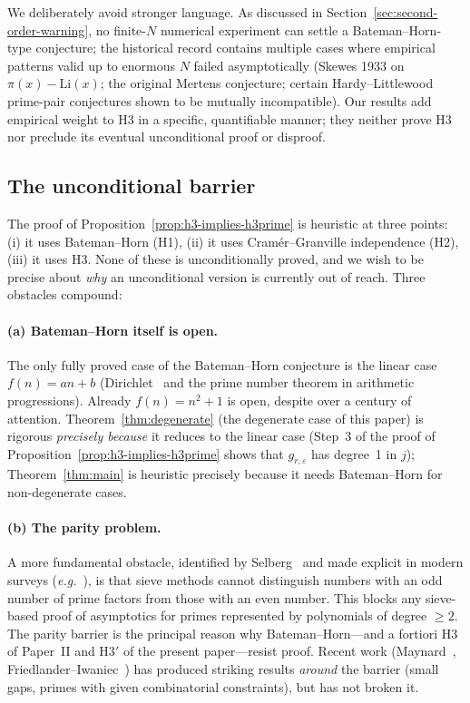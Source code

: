 \documentclass[11pt,a4paper]{article}
\theoremstyle{plain}
\theoremstyle{definition}
\newcommand{\eps}{\varepsilon}
\begin{document}
We deliberately avoid stronger language. As discussed in
Section~\ref{sec:second-order-warning}, no finite-$N$ numerical experiment
can settle a Bateman--Horn-type conjecture; the historical record contains
multiple cases where empirical patterns valid up to enormous $N$ failed
asymptotically (Skewes 1933 on $\pi(x) - \mathrm{Li}(x)$; the original
Mertens conjecture; certain Hardy--Littlewood prime-pair conjectures
shown to be mutually incompatible). Our results add empirical weight to
H3 in a specific, quantifiable manner; they neither prove H3 nor preclude
its eventual unconditional proof or disproof.

\subsection{The unconditional barrier}

The proof of Proposition~\ref{prop:h3-implies-h3prime} is heuristic at three
points: (i) it uses Bateman--Horn (H1), (ii) it uses Cramér--Granville
independence (H2), (iii) it uses H3. None of these is unconditionally proved,
and we wish to be precise about \emph{why} an unconditional version is currently
out of reach. Three obstacles compound:

\paragraph{(a) Bateman--Horn itself is open.} The only fully proved case of the
Bateman--Horn conjecture is the linear case $f(n) = an + b$
(Dirichlet~\cite{dirichlet} and the prime number theorem in arithmetic
progressions). Already $f(n) = n^2 + 1$ is open, despite over a century of
attention. Theorem~\ref{thm:degenerate} (the degenerate case of this paper) is
rigorous \emph{precisely because} it reduces to the linear case (Step~3 of the
proof of Proposition~\ref{prop:h3-implies-h3prime} shows that $g_{r,\eps}$ has
degree~1 in $j$); Theorem~\ref{thm:main} is heuristic precisely because it
needs Bateman--Horn for non-degenerate cases.

\paragraph{(b) The parity problem.} A more fundamental obstacle, identified by
Selberg~\cite{selberg} and made explicit in modern surveys
(\textit{e.g.}~\cite{friedlander, iwaniec}), is that sieve methods cannot
distinguish numbers with an odd number of prime factors from those with an
even number. This blocks any sieve-based proof of asymptotics for primes
represented by polynomials of degree $\ge 2$. The parity barrier is the
principal reason why Bateman--Horn---and a fortiori H3 of Paper~II and H3$'$
of the present paper---resist proof. Recent work (Maynard~\cite{maynard},
Friedlander--Iwaniec~\cite{friedlander}) has produced striking results
\emph{around} the barrier (small gaps, primes with given combinatorial
constraints), but has not broken it.
\end{document}
